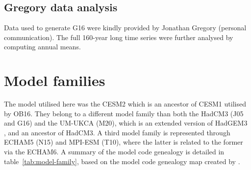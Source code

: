 \documentclass[draft]{agujournal2019}
\begin{document}
\subsection{Gregory data analysis}\label{ap:g16}

Data used to generate G16 were kindly provided by Jonathan Gregory (personal
communication). The full 160-year long time series were further analysed by computing
annual means.

\section{Model families}

The model utilised here was the CESM2 which is an ancestor of CESM1 utilised by OB16.
They belong to a different model family than both the HadCM3 (J05 and G16) and the
UM-UKCA (M20), which is an extended version of HadGEM3 \cite{dhomse2014}, and an
ancestor of HadCM3. A third model family is represented through ECHAM5 (N15) and MPI-ESM
(T10), where the latter is related to the former via the ECHAM6. A summary of the model
code genealogy is detailed in table~\ref{tab:model-family}, based on the model code
genealogy map created by .
\end{document}
